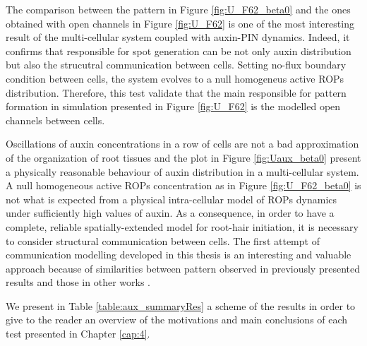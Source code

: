 The comparison between the pattern in Figure \ref{fig:U_F62_beta0} and the ones obtained with open channels in Figure \ref{fig:U_F62} is one of the most interesting result of the multi-cellular system coupled with auxin-PIN dynamics. Indeed, it confirms that responsible for spot generation can be not only auxin distribution but also the strucutral communication between cells. Setting no-flux boundary condition between cells, the system evolves to a null homogeneus active ROPs distribution. Therefore, this test validate that the main responsible for pattern formation in simulation presented in Figure \ref{fig:U_F62} is the modelled open channels between cells.

Oscillations of auxin concentrations in a row of cells are not a bad approximation of the organization of root tissues \cite{plant:Farcot} and the plot in Figure \ref{fig:Uaux_beta0} present a physically reasonable behaviour of auxin distribution in a multi-cellular system. A null homogeneous active ROPs concentration as in Figure \ref{fig:U_F62_beta0} is not what is expected from a physical intra-cellular model of ROPs dynamics under sufficiently high values of auxin. As a consequence, in order to have a complete, reliable spatially-extended model for root-hair initiation, it is necessary to consider structural communication between cells. The first attempt of communication modelling developed in this thesis is an interesting and valuable approach because of similarities between pattern observed in previously presented results and those in other works \cite{phdthesis:victor}.

We present in Table \ref{table:aux_summaryRes} a scheme of the results in order to give to the reader an overview of the motivations and main conclusions of each test presented in Chapter \ref{cap:4}.


